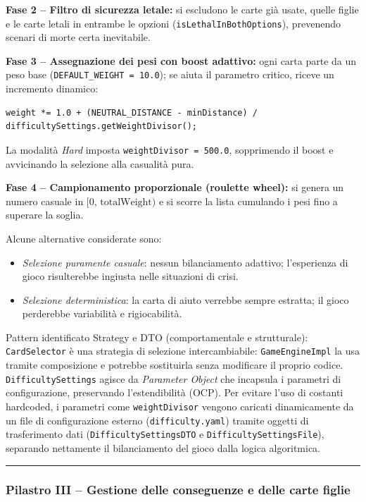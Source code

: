 \documentclass[11pt, a4paper, oneside]{report}
\begin{document}
\textbf{Fase 2 -- Filtro di sicurezza letale:} si escludono le carte già usate, quelle figlie e le carte letali in entrambe le opzioni (\texttt{isLethalInBothOptions}), prevenendo scenari di morte certa inevitabile.

\textbf{Fase 3 -- Assegnazione dei pesi con boost adattivo:} ogni carta parte da un peso base (\texttt{DEFAULT\_WEIGHT = 10.0}); se aiuta il parametro critico, riceve un incremento dinamico:
\begin{lstlisting}
weight *= 1.0 + (NEUTRAL_DISTANCE - minDistance) / difficultySettings.getWeightDivisor();
\end{lstlisting}
La modalità \emph{Hard} imposta \texttt{weightDivisor = 500.0}, sopprimendo il boost e avvicinando la selezione alla casualità pura.

\textbf{Fase 4 -- Campionamento proporzionale (roulette wheel):} si genera un numero casuale in $[0,\,\text{totalWeight})$ e si scorre la lista cumulando i pesi fino a superare la soglia.

Alcune alternative considerate sono:
\begin{itemize}
    \item \emph{Selezione puramente casuale}: nessun bilanciamento adattivo; l'esperienza di gioco risulterebbe ingiusta nelle situazioni di crisi.
    \item \emph{Selezione deterministica}: la carta di aiuto verrebbe sempre estratta; il gioco perderebbe variabilità e rigiocabilità.
\end{itemize}

Pattern identificato Strategy e DTO (comportamentale e strutturale): \texttt{CardSelector} è una strategia di selezione intercambiabile: \texttt{GameEngineImpl} la usa tramite composizione e potrebbe sostituirla senza modificare il proprio codice. \texttt{DifficultySettings} agisce da \emph{Parameter Object} che incapsula i parametri di configurazione, preservando l'estendibilità (OCP). Per evitare l'uso di costanti hardcoded, i parametri come \texttt{weightDivisor} vengono caricati dinamicamente da un file di configurazione esterno (\texttt{difficulty.yaml}) tramite oggetti di trasferimento dati (\texttt{DifficultySettingsDTO} e \texttt{DifficultySettingsFile}), separando nettamente il bilanciamento del gioco dalla logica algoritmica.

\bigskip\noindent\rule{\linewidth}{0.4pt}\bigskip

\subsubsection{Pilastro III -- Gestione delle conseguenze e delle carte figlie}
\end{document}

